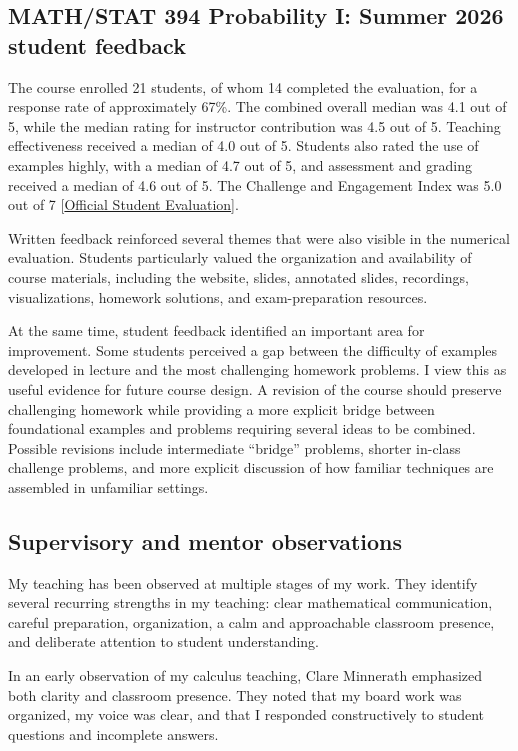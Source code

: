 \documentclass[11pt]{article}
\begin{document}
\subsection{MATH/STAT 394 Probability I:
Summer 2026 student feedback}

The course enrolled 21 students,
of whom 14 completed the evaluation,
for a response rate of approximately 67\%.
The combined overall median was 4.1 out of 5,
while the median rating for instructor contribution was
4.5 out of 5.
Teaching effectiveness received a median of 4.0 out of 5.
Students also rated the use of examples highly,
with a median of 4.7 out of 5,
and assessment and grading received a median of
4.6 out of 5.
The Challenge and Engagement Index was 5.0 out of 7
[\hyperref[appendix:math394-eval]{Official Student Evaluation}].

Written feedback reinforced several themes that were also
visible in the numerical evaluation.
Students particularly valued the organization and availability
of course materials,
including the website,
slides,
annotated slides,
recordings,
visualizations,
homework solutions,
and exam-preparation resources.

At the same time,
student feedback identified an important area for improvement.
Some students perceived a gap between the difficulty of
examples developed in lecture and the most challenging
homework problems. I view this as useful evidence for future course design.
A revision of the course should preserve challenging homework
while providing a more explicit bridge between foundational
examples and problems requiring several ideas to be combined.
Possible revisions include intermediate ``bridge'' problems,
shorter in-class challenge problems,
and more explicit discussion of how familiar techniques are
assembled in unfamiliar settings.
\subsection{Supervisory and mentor observations}

My teaching has been observed at multiple stages of my work. They
 identify several recurring strengths in my teaching:
clear mathematical communication,
careful preparation,
organization,
a calm and approachable classroom presence,
and deliberate attention to student understanding.

In an early observation of my calculus teaching,
Clare Minnerath emphasized both clarity and classroom presence.
They noted that my board work was organized,
my voice was clear,
and that I responded constructively to student questions and incomplete
answers.
\end{document}
